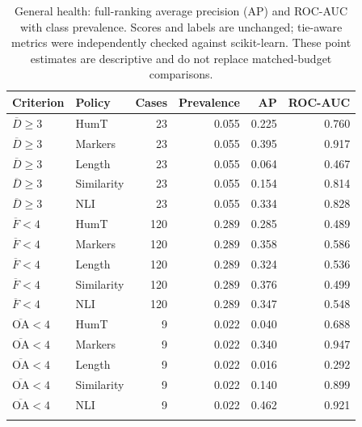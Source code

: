 \begin{table}[p]
\centering\footnotesize
\caption{General health: full-ranking average precision (AP) and ROC-AUC with class prevalence. Scores and labels are unchanged; tie-aware metrics were independently checked against scikit-learn. These point estimates are descriptive and do not replace matched-budget comparisons.}
\label{tab:ranking_health}
\begin{tabular}{llrrrr}
\toprule
Criterion & Policy & Cases & Prevalence & AP & ROC-AUC \\
\midrule
$\overline D\geq3$ & HumT & 23 & 0.055 & 0.225 & 0.760 \\
$\overline D\geq3$ & Markers & 23 & 0.055 & 0.395 & 0.917 \\
$\overline D\geq3$ & Length & 23 & 0.055 & 0.064 & 0.467 \\
$\overline D\geq3$ & Similarity & 23 & 0.055 & 0.154 & 0.814 \\
$\overline D\geq3$ & NLI & 23 & 0.055 & 0.334 & 0.828 \\
\addlinespace
$\overline F<4$ & HumT & 120 & 0.289 & 0.285 & 0.489 \\
$\overline F<4$ & Markers & 120 & 0.289 & 0.358 & 0.586 \\
$\overline F<4$ & Length & 120 & 0.289 & 0.324 & 0.536 \\
$\overline F<4$ & Similarity & 120 & 0.289 & 0.376 & 0.499 \\
$\overline F<4$ & NLI & 120 & 0.289 & 0.347 & 0.548 \\
\addlinespace
$\overline{\mathrm{OA}}<4$ & HumT & 9 & 0.022 & 0.040 & 0.688 \\
$\overline{\mathrm{OA}}<4$ & Markers & 9 & 0.022 & 0.340 & 0.947 \\
$\overline{\mathrm{OA}}<4$ & Length & 9 & 0.022 & 0.016 & 0.292 \\
$\overline{\mathrm{OA}}<4$ & Similarity & 9 & 0.022 & 0.140 & 0.899 \\
$\overline{\mathrm{OA}}<4$ & NLI & 9 & 0.022 & 0.462 & 0.921 \\
\addlinespace
\bottomrule
\end{tabular}
\end{table}
